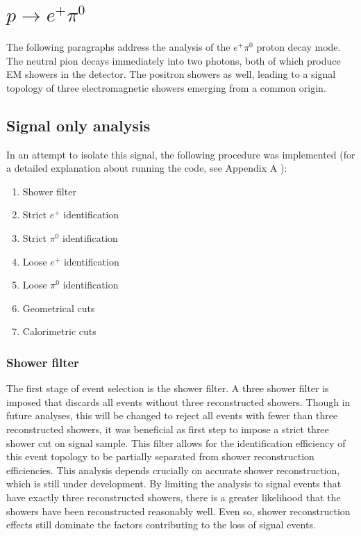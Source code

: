 \documentclass[a4paper, 10pt]{article}
\begin{document}
\clearpage
\section{$p \rightarrow e^{+} \pi^{0}$}
The following paragraphs address the analysis of the  $e^{+} \pi^{0}$ proton decay mode.\\
The neutral pion decays immediately into two photons, both of which produce EM showers in the detector. The positron showers as well, leading to a signal topology of three electromagnetic showers emerging from a common origin.
\subsection{Signal only analysis}

In an attempt to isolate this signal, the following procedure was implemented (for a detailed explanation about running the code, see Appendix A ):
\begin{enumerate}[topsep=10pt,itemsep=-1ex,partopsep=10pt,parsep=1ex]
\item Shower filter
\item Strict $e^{+}$ identification
\item Strict $\pi^{0}$ identification
\item Loose $e^{+}$ identification
\item Loose $\pi^{0}$ identification
\item Geometrical cuts
\item Calorimetric cuts
\end{enumerate}


\subsubsection{Shower filter}

The first stage of event selection is the shower filter. A three shower filter is imposed that discards all events without three reconstructed showers. Though in future analyses, this will be changed to reject all events with fewer than three reconstructed showers, it was beneficial as first step  to impose a strict three shower cut on signal sample. This filter allows for the identification efficiency of this event topology to be partially separated from shower reconstruction efficiencies. This analysis depends crucially on accurate shower reconstruction, which is still under development. By limiting the analysis to signal events that have exactly three reconstructed showers, there is a greater likelihood that the showers have been reconstructed reasonably well. Even so, shower reconstruction effects still dominate the factors contributing to the loss of signal events.
\end{document}
